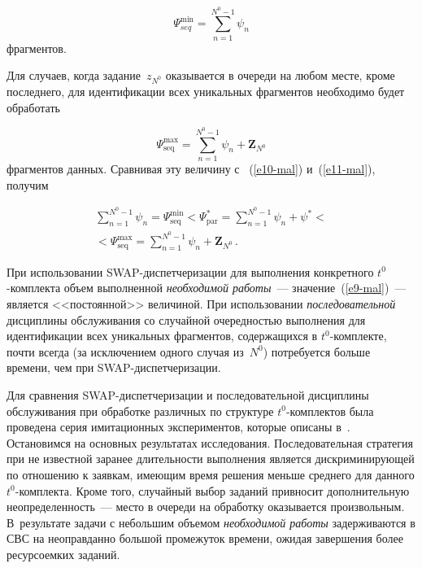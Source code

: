 \begin{multicols}{2}
\noindent
\begin{equation}
\Psi^{\min}_{seq} = \sum\limits_{n = 1}^{N^0 - 1} \psi_n 
\label{e11-mal}
\end{equation} 
фрагментов.

Для случаев, когда задание~$z_{N^0}$ оказывается в очереди на любом
месте, кроме последнего, для идентификации всех уникальных фрагментов
необходимо будет обработать

\noindent
$$
\Psi^{\max}_{\mathrm{seq}} = \sum\limits_{n = 1}^{N^0 - 1} \psi_n + \textbf{Z}_{N^0} 
$$
фрагментов данных. Сравнивая эту величину с ~(\ref{e10-mal}) и~(\ref{e11-mal}), получим

\noindent
\begin{multline*}
\sum\limits_{n = 1}^{N^0 - 1} \psi_n = \Psi^{\min}_{\mathrm{seq}} <  
\Psi^*_{\mathrm{par}} = \sum\limits_{n = 1}^{N^0 - 1} \psi_n + \psi^* 
< {}\\
{}<\Psi^{\max}_{\mathrm{seq}} = \sum\limits_{n = 1}^{N^0 - 1} \psi_n + \textbf{Z}_{N^0}\,. 
\end{multline*}

При использовании SWAP-дис\-пет\-че\-ри\-за\-ции для выполнения конкретного
$t^0$-ком\-плек\-та объем выполненной \textit{необходимой работы}~---
значение~(\ref{e9-mal})~---  является <<постоянной>> величиной. При
использовании \textit{последовательной} дисциплины обслуживания со
случайной очередностью выполнения для идентификации всех уникальных
фрагментов, содержащихся в $t^0$-ком\-плек\-те, почти всегда (за
исключением одного случая из~$N^0$) потребуется больше времени, чем
при SWAP-дис\-пет\-че\-ри\-зации.

Для сравнения SWAP-дис\-пет\-че\-ри\-за\-ции и последовательной дисциплины
обслуживания при обработке различных по структуре $t^0$-ком\-плек\-тов
была проведена серия имитационных экспериментов, которые описаны 
в~\cite{Prep11, Gol12}. Остановимся на основных результатах
исследования. Последовательная стратегия при не известной заранее
дли\-тель\-ности выполнения является дискриминирующей по отношению к
заявкам, имеющим время решения меньше среднего для данного
$t^0$-комплекта.  Кроме того, случайный выбор заданий привносит
дополнительную неопределенность~--- место в очереди на обработку
оказывается произвольным. В~результате задачи с небольшим объемом
\textit{необходимой работы} задерживаются в СВС на неоправданно
большой промежуток времени, ожидая завершения более ресурсоемких
заданий.


\end{multicols}

